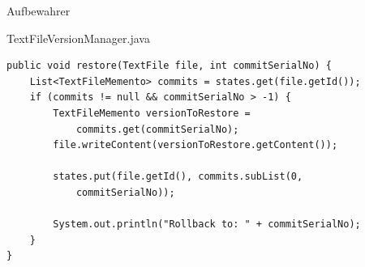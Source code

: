 \begin{frame}[fragile]{Aufbewahrer}
	\begin{exampleblock}{TextFileVersionManager.java}
 		\begin{lstlisting}
public void restore(TextFile file, int commitSerialNo) {
    List<TextFileMemento> commits = states.get(file.getId());
    if (commits != null && commitSerialNo > -1) {
        TextFileMemento versionToRestore = 
            commits.get(commitSerialNo);
        file.writeContent(versionToRestore.getContent());

        states.put(file.getId(), commits.subList(0, 
            commitSerialNo));

        System.out.println("Rollback to: " + commitSerialNo);
    }
}
 		\end{lstlisting}
 	\end{exampleblock}
\end{frame}